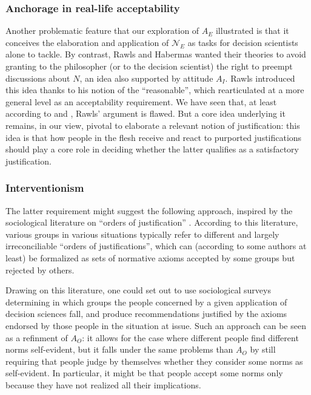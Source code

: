 \documentclass[preprint, french, english, 11pt, authoryear]{elsarticle}%
\begin{document}
\subsubsection{Anchorage in real-life acceptability}
Another problematic feature that our exploration of $A_E$ illustrated is that it conceives the elaboration and application of $\mathscr{N}_E$ as tasks for decision scientists alone to tackle. By contrast, Rawls and Habermas wanted their theories to avoid granting to the philosopher (or to the decision scientist) the right to preempt discussions about $N$, an idea also supported by attitude $A_I$. Rawls introduced this idea thanks to his notion of the ``reasonable'', which \cite{estlund_democratic_2009} rearticulated at a more general level as an acceptability requirement. We have seen that, at least according to \cite{habermas_reconciliation_1995} and \cite{estlund_democratic_2009}, Rawls' argument is flawed. But a core idea underlying it remains, in our view, pivotal to elaborate a relevant notion of justification: this idea is that how people in the flesh receive and react to purported justifications should play a core role in deciding whether the latter qualifies as a satisfactory justification.

\subsubsection{Interventionism}
The latter requirement might suggest the following approach, inspired by the sociological literature on “orders of justification” \citep{boltanski_justification_2006}. According to this literature, various groups in various situations typically refer to different and largely irreconciliable “orders of justifications”, which can (according to some authors at least) be formalized as sets of normative axioms accepted by some groups but rejected by others.

Drawing on this literature, one could set out to use sociological surveys determining in which groups the people concerned by a given application of decision sciences fall, and produce recommendations justified by the axioms endorsed by those people in the situation at issue. Such an approach can be seen as a refinment of $A_O$: it allows for the case where different people find different norms self-evident, but it falls under the same problems than $A_O$ by still requiring that people judge by themselves whether they consider some norms as self-evident. In particular, it might be that people accept some norms only because they have not realized all their implications.
\end{document}
